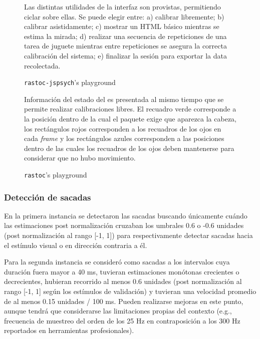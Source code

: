\begin{figure}
    \centering
    \caption{\texttt{rastoc-jspsych}’s playground}
    Las distintas utilidades de la interfaz \jspsych son provistas, permitiendo
    ciclar sobre ellas.
    Se puede elegir entre:
    a) calibrar libremente;
    b) calibrar asistidamente;
    c) mostrar un HTML básico mientras se estima la mirada;
    d) realizar una secuencia de repeticiones de una tarea de juguete mientras
    entre repeticiones se asegura la correcta calibración del sistema;
    e) finalizar la sesión para exportar la data recolectada.
    \label{fig:rastoc-jspsych-playground}
\end{figure}

\begin{figure}
    \centering
    \caption{\texttt{rastoc}’s playground}
    Información del estado del \eyetracker es presentada al mismo tiempo que se
    permite realizar calibraciones libres.
    El recuadro verde corresponde a la posición dentro de la cual el paquete
    \webgazer exige que aparezca la cabeza, los rectángulos rojos corresponden
    a los recuadros de los ojos en cada \textit{frame} y los rectángulos azules
    corresponden a las posiciones dentro de las cuales los recuadros de los
    ojos deben mantenerse para considerar que no hubo movimiento.
    \label{fig:rastoc-playground}
\end{figure}

\subsubsection{Detección de sacadas}

En la primera instancia se detectaron las sacadas buscando únicamente cuándo
las estimaciones post normalización cruzaban los umbrales 0.6 o -0.6 unidades
(post normalización al rango [-1, 1]) para respectivamente detectar sacadas
hacia el estímulo visual o en dirección contraria a él.

Para la segunda instancia se consideró como sacadas a los intervalos cuya
duración fuera mayor a 40 ms, tuvieran estimaciones monótonas crecientes o
decrecientes, hubieran recorrido al menos 0.6 unidades (post normalización al
rango [-1, 1] según los estímulos de validación) y tuvieran una velocidad
promedio de al menos 0.15 unidades / 100 ms.
Pueden realizarse mejoras en este punto, aunque tendrá que considerarse las
limitaciones propias del contexto (e.g., frecuencia de muestreo del orden de
los 25 Hz en contraposición a los 300 Hz reportados en herramientas
profesionales).


